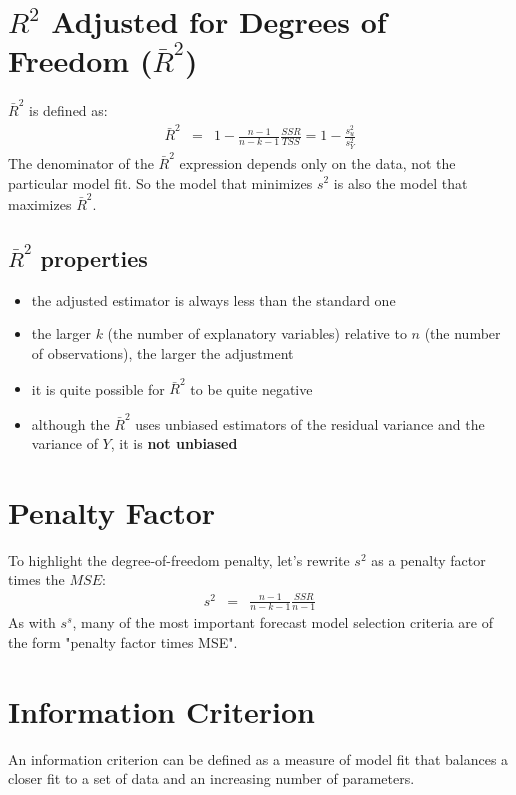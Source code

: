 \section{\texorpdfstring{$R^{2}$}{R2Adjusted} Adjusted for Degrees of Freedom (\texorpdfstring{$\bar{R}^{2}$}{R2})}
$\bar{R}^{2}$ is defined as:
\begin{eqnarray}
\bar{R}^{2} &=& 1 - \frac{n - 1}{n - k -1}\frac{SSR}{TSS} = 1 - \frac{s_{u}^{2}}{s_{Y}^{2}}
\end{eqnarray}
The denominator of the $\bar{R}^{2}$ expression depends only on the data, not the particular model fit. So the model that minimizes $s^{2}$ is also the model that maximizes $\bar{R}^{2}$.

\subsection{\texorpdfstring{$\bar{R}^{2}$}{R2} properties}
\begin{itemize}
	\item the adjusted estimator is always less than the standard one
	\item the larger $k$ (the number of explanatory variables) relative to $n$ (the number of observations), the larger the adjustment
	\item it is quite possible for $\bar{R}^{2}$ to be quite negative
	\item although the $\bar{R}^{2}$ uses unbiased estimators of the residual variance and the variance of $Y$, it is \textbf{\color{blue} not unbiased}
\end{itemize}

\section{Penalty Factor}
To highlight the degree-of-freedom penalty, let's rewrite $s^{2}$ as a penalty factor times the $MSE$:
\begin{eqnarray}
s^{2} &=& \frac{n - 1}{n - k - 1}\frac{SSR}{n - 1}
\end{eqnarray}
As with $s^{s}$, many of the most important forecast model selection criteria are of the form "penalty factor times MSE".

\section{Information Criterion}
An information criterion can be defined as a measure of model fit that balances a closer fit to a set of data and an increasing number of parameters.

